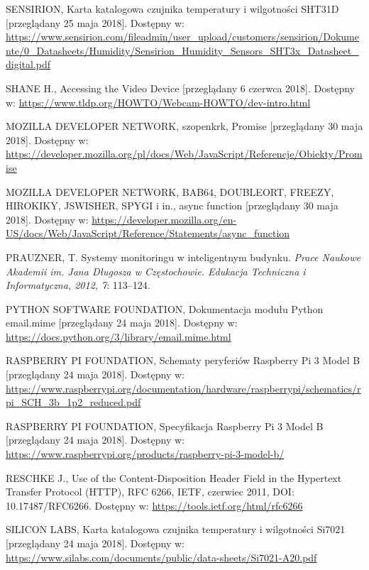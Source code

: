\documentclass[a4paper,11pt,twoside]{article}
\begin{document}
\begin{thebibliography}{9}
\uppercase{Sensirion}, Karta katalogowa czujnika temperatury i wilgotności SHT31D [przeglądany 25 maja 2018].
Dostępny w: \url{https://www.sensirion.com/fileadmin/user_upload/customers/sensirion/Dokumente/0_Datasheets/Humidity/Sensirion_Humidity_Sensors_SHT3x_Datasheet_digital.pdf}

SHANE H., Accessing the Video Device [przeglądany 6 czerwca 2018].
Dostępny w: \url{https://www.tldp.org/HOWTO/Webcam-HOWTO/dev-intro.html}

\uppercase{Mozilla Developer Network}, szopenkrk, Promise [przeglądany 30 maja 2018].
Dostępny w: \url{https://developer.mozilla.org/pl/docs/Web/JavaScript/Referencje/Obiekty/Promise}

\uppercase{Mozilla Developer Network, Bab64, doubleOrt, freezy, hirokiky, jswisher, spygi} i in., async function [przeglądany 30 maja 2018].
Dostępny w: \url{https://developer.mozilla.org/en-US/docs/Web/JavaScript/Reference/Statements/async_function}

PRAUZNER, T. Systemy monitoringu w inteligentnym budynku. \textit{Prace Naukowe Akademii im. Jana Długosza w Częstochowie. Edukacja Techniczna i Informatyczna, 2012, 7}: 113--124.

\uppercase{Python Software Foundation}, Dokumentacja modułu Python email.mime [przeglądany 24 maja 2018].
Dostępny w: \url{https://docs.python.org/3/library/email.mime.html}

\uppercase{Raspberry Pi Foundation}, Schematy peryferiów Raspberry Pi 3 Model B [przeglądany 24 maja 2018].
Dostępny w: \url{https://www.raspberrypi.org/documentation/hardware/raspberrypi/schematics/rpi_SCH_3b_1p2_reduced.pdf}

\uppercase{Raspberry Pi Foundation}, Specyfikacja Raspberry Pi 3 Model B [przeglądany 24 maja 2018].
Dostępny w: \url{https://www.raspberrypi.org/products/raspberry-pi-3-model-b/}

\uppercase{Reschke J.}, Use of the Content-Disposition Header Field in the Hypertext Transfer Protocol (HTTP), RFC 6266, IETF, czerwiec 2011, DOI: 10.17487/RFC6266.
Dostępny w: \url{https://tools.ietf.org/html/rfc6266}

\uppercase{Silicon Labs}, Karta katalogowa czujnika temperatury i wilgotności Si7021 [przeglądany 24 maja 2018].
Dostępny w: \url{https://www.silabs.com/documents/public/data-sheets/Si7021-A20.pdf}


\end{thebibliography}
\end{document}
